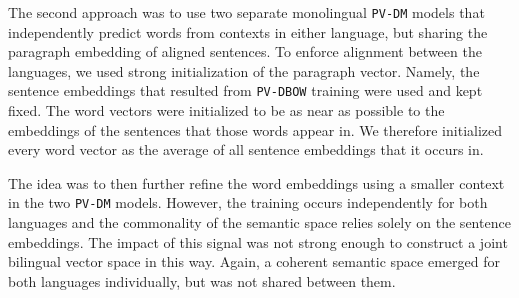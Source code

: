 
The second approach was to use two separate monolingual \texttt{PV-DM} models that  independently predict words from contexts in either language, but sharing the paragraph embedding of aligned sentences. To enforce alignment between the languages, we used strong initialization of the paragraph vector. Namely, the sentence embeddings that resulted from {\tt PV-DBOW} training were used and kept fixed.
The word vectors were initialized to be as near as possible to the embeddings of the sentences that those words appear in.
We therefore initialized every word vector as the average of all sentence embeddings that it occurs in.

The idea was to then further refine the word embeddings using a smaller context in the two \texttt{PV-DM} models.
However, the training occurs independently for both languages and the commonality of the semantic space relies solely on the sentence embeddings. The impact of this signal was not strong enough to construct a joint bilingual vector space in this way. Again, a coherent semantic space emerged for both languages individually, but was not shared between them. 


